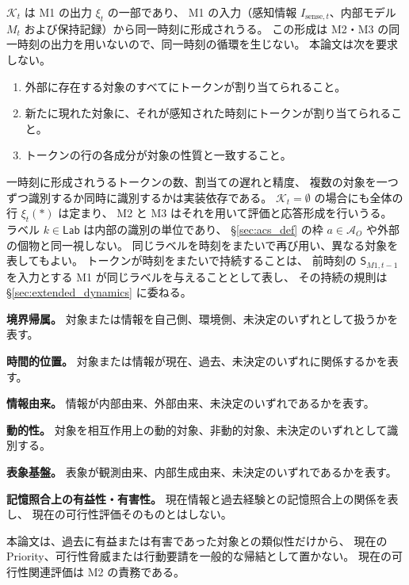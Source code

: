 \begin{remark}[内部対象トークンの形成と実装依存の範囲]
\label{rem:token_generation}
$\mathcal K_t$ は M1 の出力 $\xi_t$ の一部であり、
M1 の入力（感知情報 $I_{\mathrm{sense},t}$、内部モデル $M_t$ および保持記録）から同一時刻に形成されうる。
この形成は M2・M3 の同一時刻の出力を用いないので、同一時刻の循環を生じない。
本論文は次を要求しない。
\begin{enumerate}[label=(\alph*)]
  \item 外部に存在する対象のすべてにトークンが割り当てられること。
  \item 新たに現れた対象に、それが感知された時刻にトークンが割り当てられること。
  \item トークンの行の各成分が対象の性質と一致すること。
\end{enumerate}
一時刻に形成されうるトークンの数、割当ての遅れと精度、
複数の対象を一つずつ識別するか同時に識別するかは実装依存である。
$\mathcal K_t=\emptyset$ の場合にも全体の行 $\xi_t(\ast)$ は定まり、
M2 と M3 はそれを用いて評価と応答形成を行いうる。
ラベル $k\in\mathsf{Lab}$ は内部の識別の単位であり、
\S\ref{sec:acs_def} の枠 $a\in\mathcal A_O$ や外部の個物と同一視しない。
同じラベルを時刻をまたいで再び用い、異なる対象を表してもよい。
トークンが時刻をまたいで持続することは、
前時刻の $\mathsf S_{M1,t-1}$ を入力とする M1 が同じラベルを与えることとして表し、
その持続の規則は \S\ref{sec:extended_dynamics} に委ねる。
\end{remark}

\noindent\textbf{境界帰属。}
対象または情報を自己側、環境側、未決定のいずれとして扱うかを表す。

\noindent\textbf{時間的位置。}
対象または情報が現在、過去、未決定のいずれに関係するかを表す。

\noindent\textbf{情報由来。}
情報が内部由来、外部由来、未決定のいずれであるかを表す。

\noindent\textbf{動的性。}
対象を相互作用上の動的対象、非動的対象、未決定のいずれとして識別する。

\noindent\textbf{表象基盤。}
表象が観測由来、内部生成由来、未決定のいずれであるかを表す。

\noindent\textbf{記憶照合上の有益性・有害性。}
現在情報と過去経験との記憶照合上の関係を表し、
現在の可行性評価そのものとはしない。

\begin{remark}
\label{rem:mval_identification}
本論文は、過去に有益または有害であった対象との類似性だけから、
現在の Priority、可行性脅威または行動要請を一般的な帰結として置かない。
現在の可行性関連評価は M2 の責務である。
\end{remark}

